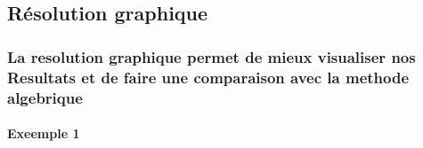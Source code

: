 \documentclass[
]{article}
\begin{document}
\hypertarget{ruxe9solution-graphique}{%
\subsection{Résolution graphique}\label{ruxe9solution-graphique}}

\hypertarget{la-resolution-graphique-permet-de-mieux-visualiser-nos-resultats-et-de-faire-une-comparaison-avec-la-methode-algebrique}{%
\subsubsection{La resolution graphique permet de mieux visualiser nos
Resultats et de faire une comparaison avec la methode
algebrique}\label{la-resolution-graphique-permet-de-mieux-visualiser-nos-resultats-et-de-faire-une-comparaison-avec-la-methode-algebrique}}

\hypertarget{exeemple-1}{%
\paragraph{Exeemple 1}\label{exeemple-1}}
\end{document}
